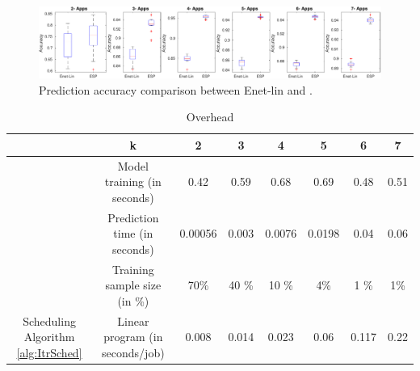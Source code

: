 \begin{figure}[t]
\begin{center}
 \includegraphics[width=1\textwidth]{figures/accuracy_boxplot_ridge_lasso_enet2.pdf}
 \caption{\small Prediction accuracy comparison between Enet-lin and
     \SYSTEM{}. 
   }
\label{fig:est:box-plot}
\end{center}
\end{figure}

\begin{table}[t]
\centering
\caption{Overhead}
\footnotesize
\begin{tabular}{ c|c|c|c|c|c|c|c }
 \hline
 \hline
 &k & 2 & 3 &4 & 5 & 6 & 7 \\
 \hline
\multirow {3}{*}{\SYSTEM{}}  & Model training (in seconds)   & 0.42    & 0.59 &   0.68 & 0.69 & 0.48 & 0.51\\ 
& Prediction time (in seconds)  &   0.00056  & 0.003   &0.0076 & 0.0198 & 0.04 & 0.06\\
& Training sample size (in \%)  & 70\% & 40 \% &  10 \% & 4\% & 1 \% & 1\% \\ \hline \hline
\multirow {1}{*}{Scheduling Algorithm \ref{alg:ItrSched}}  & Linear program (in seconds/job) &   0.008 & 0.014 & 0.023 & 0.06 & 0.117 & 0.22\\
 \hline
 \hline
\end{tabular}
 \label{table:overhead}
\end{table}

